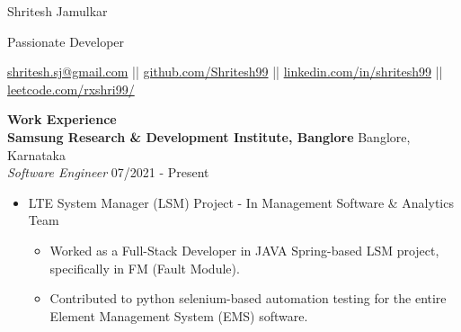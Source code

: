 \documentclass{article}
\begin{document}
\begin{center}

\LARGE Shritesh Jamulkar \\

\vspace{3pt}

\large \textcolor{NavyBlue}{Passionate Developer} \\

\vspace{5pt}

\normalsize \href{mailto:shritesh.sj@gmail@gmail.com}{shritesh.sj@gmail.com} || \href{https://github.com/Shritesh99}{github.com/Shritesh99} || \href{https://linkedin.com/in/shritesh99}{linkedin.com/in/shritesh99} || \href{https://leetcode.com/rxshri99/}{leetcode.com/rxshri99/} \\
\end{center}

\noindent \large \textbf{\textcolor{NavyBlue}{Work Experience}} \vspace{5pt} \\
\noindent \normalsize \textbf{Samsung Research \& Development Institute, Banglore} \hfill Banglore, Karnataka \\
\textit{Software Engineer} \hfill 07/2021 - Present
\begin{itemize}[noitemsep,nolistsep,leftmargin=*]
    \item {\normalsize {LTE System Manager (LSM) Project - In Management Software \& Analytics Team }
        \begin{itemize}
            \item Worked as a Full-Stack Developer in JAVA Spring-based LSM project, specifically in FM (Fault Module).
            \item Contributed to python selenium-based automation testing for the entire Element Management System (EMS) software.
        \end{itemize}
    }
\end{itemize}

\vspace{5pt}
\end{document}
